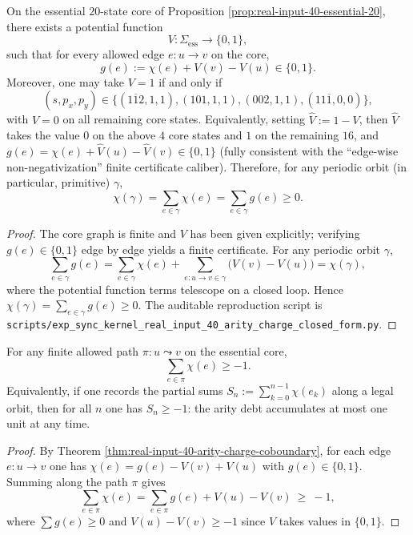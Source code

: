 \begin{theorem}\label{thm:real-input-40-arity-charge-coboundary}
On the essential $20$-state core of Proposition \ref{prop:real-input-40-essential-20}, there exists a potential function
\[
V:\Sigma_{\mathrm{ess}}\to\{0,1\},
\]
such that for every allowed edge $e:u\to v$ on the core,
\[
g(e):=\chi(e)+V(v)-V(u)\in\{0,1\}.
\]
Moreover, one may take $V=1$ if and only if
\[
(s,p_x,p_y)\in\{(1\overline{1}2,1,1),(101,1,1),(002,1,1),(11\overline{1},0,0)\},
\]
with $V=0$ on all remaining core states.
Equivalently, setting $\widehat V:=1-V$, then $\widehat V$ takes the value $0$ on the above $4$ core states and $1$ on the remaining $16$, and
\(
g(e)=\chi(e)+\widehat V(u)-\widehat V(v)\in\{0,1\}
\)
(fully consistent with the ``edge-wise non-negativization'' finite certificate caliber).
Therefore, for any periodic orbit (in particular, primitive) $\gamma$,
\[
\chi(\gamma)=\sum_{e\in\gamma}\chi(e)=\sum_{e\in\gamma}g(e)\ge 0.
\]
\end{theorem}

\begin{proof}
The core graph is finite and $V$ has been given explicitly; verifying $g(e)\in\{0,1\}$ edge by edge yields a finite certificate.
For any periodic orbit $\gamma$,
\[
\sum_{e\in\gamma}g(e)=\sum_{e\in\gamma}\chi(e)+\sum_{e:u\to v\in\gamma}\bigl(V(v)-V(u)\bigr)=\chi(\gamma),
\]
where the potential function terms telescope on a closed loop. Hence $\chi(\gamma)=\sum_{e\in\gamma}g(e)\ge 0$.
The auditable reproduction script is
\texttt{scripts/exp\_sync\_kernel\_real\_input\_40\_arity\_charge\_closed\_form.py}.
\end{proof}

\begin{corollary}\label{cor:real-input-40-arity-charge-prefix-debt}
For any finite allowed path \(\pi:u\leadsto v\) on the essential core,
\[
\sum_{e\in\pi}\chi(e)\ge -1.
\]
Equivalently, if one records the partial sums \(S_n:=\sum_{k=0}^{n-1}\chi(e_k)\) along a legal orbit, then for all \(n\) one has \(S_n\ge -1\):
the arity debt accumulates at most one unit at any time.
\end{corollary}

\begin{proof}
By Theorem \ref{thm:real-input-40-arity-charge-coboundary}, for each edge \(e:u\to v\) one has
\(
\chi(e)=g(e)-V(v)+V(u)
\)
with \(g(e)\in\{0,1\}\).
Summing along the path \(\pi\) gives
\[
\sum_{e\in\pi}\chi(e)
=\sum_{e\in\pi}g(e)+V(u)-V(v)\ \ge\ -1,
\]
where \(\sum g(e)\ge 0\) and \(V(u)-V(v)\ge -1\) since \(V\) takes values in \(\{0,1\}\).
\end{proof}

